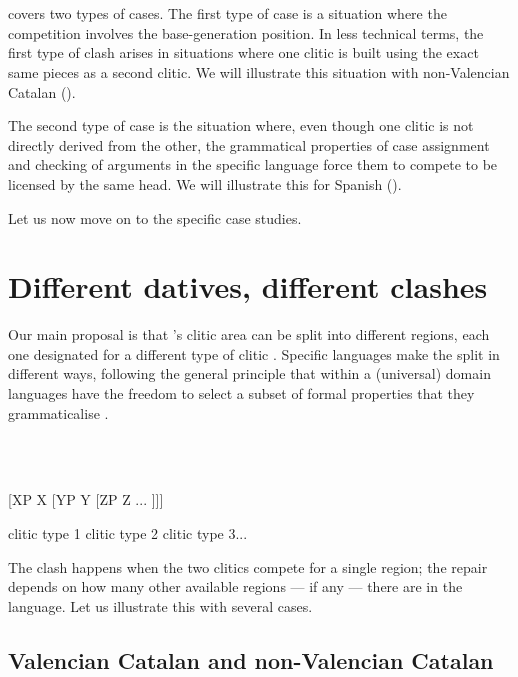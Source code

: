 \documentclass[output=paper,colorlinks,citecolor=brown]{./langscibook}
\begin{document}
\ea%
    \label{ex:key:7}
    \gll\\
        \\
    \glt
    \z

         covers two types of cases. The first type of case is a situation where the competition involves the base-generation position. In less technical terms, the first type of clash arises in situations where one clitic is built using the exact same pieces as a second clitic. We will illustrate this situation with non-Valencian Catalan (). 

The second type of case is the situation where, even though one clitic is not directly derived from the other, the grammatical properties of case assignment and checking of arguments in the specific language force them to compete to be licensed by the same head. We will illustrate this for Spanish ().

Let us now move on to the specific case studies.

\section{Different datives, different clashes} %

Our main proposal is that \citeauthor{Sportiche1996}’s clitic area can be split into different regions, each one designated for a different type of clitic . Specific languages make the split in different ways, following the general principle that within a (universal) domain languages have the freedom to select a subset of formal properties that they grammaticalise \citep{RamchandSvenonius2014, Wiltschko2014}. 

\ea%
    \label{ex:key:8}
    \gll\\
        \\
    \glt
    \z

          [XP    X  [YP    Y  [ZP  Z  ...  ]]]

  clitic type 1    clitic type 2    clitic type 3...

The clash happens when the two clitics compete for a single region; the repair depends on how many other available regions — if any — there are in the language. Let us illustrate this with several cases.

\subsection{Valencian Catalan and non-Valencian Catalan} %
\end{document}

